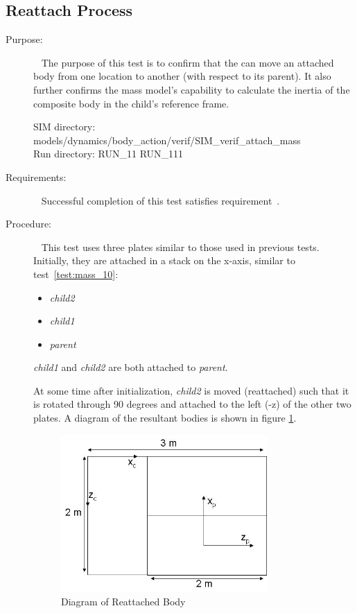\subsection{Reattach Process}
\label{test:mass_11}
\begin{description}
\item[Purpose:] \ \newline
The purpose of this test is to confirm that the \ModelDesc
can move an attached body from one location to another (with respect to its 
parent).  It also further
confirms the mass model's capability to calculate the inertia of the composite
body in the child's reference frame.

SIM directory: models/dynamics/body\_action/verif/SIM\_verif\_attach\_mass\\
Run directory: RUN\_11 RUN\_111

\item[Requirements:] \ \newline
Successful completion of this test satisfies
requirement~.

\item[Procedure:]\ \newline
This test uses three plates similar to those used in previous tests.  
Initially, they are attached in a stack on the x-axis, similar to 
test~\ref{test:mass_10}:
\begin{itemize}
 \item \textit{child2}
 \item \textit{child1}
 \item \textit{parent}
\end{itemize}

\textit{child1} and \textit{child2} are both attached to \textit{parent}.

 At some time after initialization, \textit{child2} is moved (reattached) such 
 that it is rotated through 90 degrees and attached to the left (-z) of the 
 other two plates.  A diagram
of the resultant bodies is shown in figure \ref{3body_arrange}.

\begin{figure}[h]
\begin{center}
\includegraphics[height=60mm]{pics/3body_arrange.jpg}
\caption{Diagram of Reattached Body}
\label{3body_arrange}
\end{center}
\end{figure}




\end{description}

